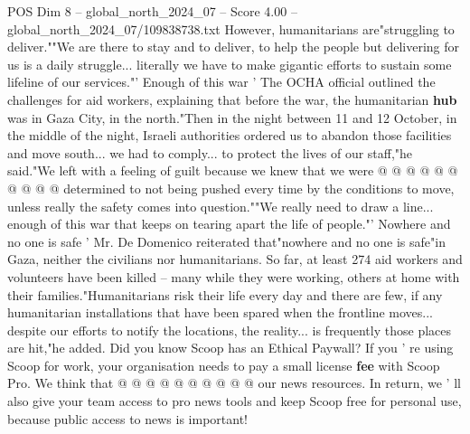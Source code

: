 \begin{textsample}{POS Dim 8 – global\_north\_2024\_07 – Score 4.00 – global\_north\_2024\_07/109838738.txt}
However, humanitarians are"struggling to deliver.""We are there to stay and to deliver, to help the people but delivering for us is a daily struggle... literally we have to make gigantic efforts to sustain some lifeline of our services."' Enough of this war ' The OCHA official outlined the challenges for aid workers, explaining that before the war, the humanitarian \textbf{hub} was in Gaza City, in the north."Then in the night between 11 and 12 October, in the middle of the night, Israeli authorities ordered us to abandon those facilities and move south... we had to comply... to protect the lives of our staff,"he said."We left with a feeling of guilt because we knew that we were @ @ @ @ @ @ @ @ @ @ determined to not being pushed every time by the conditions to move, unless really the safety comes into question.""We really need to draw a line... enough of this war that keeps on tearing apart the life of people."' Nowhere and no one is safe ' Mr.
De Domenico reiterated that"nowhere and no one is safe"in Gaza, neither the civilians nor humanitarians.
So far, at least 274 aid workers and volunteers have been killed -- many while they were working, others at home with their families."Humanitarians risk their life every day and there are few, if any humanitarian installations that have been spared when the frontline moves... despite our efforts to notify the locations, the reality... is frequently those places are hit,"he added.
Did you know Scoop has an Ethical Paywall?
If you ' re using Scoop for work, your organisation needs to pay a small license \textbf{fee} with Scoop Pro.
We think that @ @ @ @ @ @ @ @ @ @ our news resources.
In return, we ' ll also give your team access to pro news tools and keep Scoop free for personal use, because public access to news is important!

\end{textsample}
